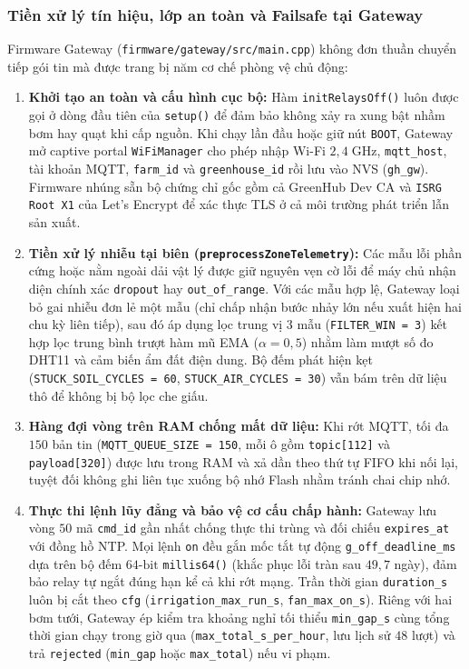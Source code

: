\subsubsection{Tiền xử lý tín hiệu, lớp an toàn và Failsafe tại Gateway}

Firmware Gateway (\texttt{firmware/gateway/src/main.cpp}) không đơn thuần chuyển tiếp gói tin mà được trang bị năm cơ chế phòng vệ chủ động:

\begin{enumerate}[leftmargin=*]
    \item \textbf{Khởi tạo an toàn và cấu hình cục bộ:} Hàm \texttt{initRelaysOff()} luôn được gọi ở dòng đầu tiên của \texttt{setup()} để đảm bảo không xảy ra xung bật nhầm bơm hay quạt khi cấp nguồn. Khi chạy lần đầu hoặc giữ nút \texttt{BOOT}, Gateway mở captive portal \texttt{WiFiManager} cho phép nhập Wi-Fi \(2{,}4\;\text{GHz}\), \texttt{mqtt\_host}, tài khoản MQTT, \texttt{farm\_id} và \texttt{greenhouse\_id} rồi lưu vào NVS (\texttt{gh\_gw}). Firmware nhúng sẵn bộ chứng chỉ gốc gồm cả GreenHub Dev CA và \texttt{ISRG Root X1} của Let's Encrypt để xác thực TLS ở cả môi trường phát triển lẫn sản xuất.
    \item \textbf{Tiền xử lý nhiễu tại biên (\texttt{preprocessZoneTelemetry}):} Các mẫu lỗi phần cứng hoặc nằm ngoài dải vật lý được giữ nguyên vẹn cờ lỗi để máy chủ nhận diện chính xác \texttt{dropout} hay \texttt{out\_of\_range}. Với các mẫu hợp lệ, Gateway loại bỏ gai nhiễu đơn lẻ một mẫu (chỉ chấp nhận bước nhảy lớn nếu xuất hiện hai chu kỳ liên tiếp), sau đó áp dụng lọc trung vị 3 mẫu (\texttt{FILTER\_WIN = 3}) kết hợp lọc trung bình trượt hàm mũ EMA (\(\alpha = 0{,}5\)) nhằm làm mượt số đo DHT11 và cảm biến ẩm đất điện dung. Bộ đếm phát hiện kẹt (\texttt{STUCK\_SOIL\_CYCLES = 60}, \texttt{STUCK\_AIR\_CYCLES = 30}) vẫn bám trên dữ liệu thô để không bị bộ lọc che giấu.
    \item \textbf{Hàng đợi vòng trên RAM chống mất dữ liệu:} Khi rớt MQTT, tối đa \(150\) bản tin (\texttt{MQTT\_QUEUE\_SIZE = 150}, mỗi ô gồm \texttt{topic[112]} và \texttt{payload[320]}) được lưu trong RAM và xả dần theo thứ tự FIFO khi nối lại, tuyệt đối không ghi liên tục xuống bộ nhớ Flash nhằm tránh chai chip nhớ.
    \item \textbf{Thực thi lệnh lũy đẳng và bảo vệ cơ cấu chấp hành:} Gateway lưu vòng \(50\) mã \texttt{cmd\_id} gần nhất chống thực thi trùng và đối chiếu \texttt{expires\_at} với đồng hồ NTP. Mọi lệnh \texttt{on} đều gắn mốc tắt tự động \texttt{g\_off\_deadline\_ms} dựa trên bộ đếm \(64\text{-bit}\) \texttt{millis64()} (khắc phục lỗi tràn sau \(49{,}7\) ngày), đảm bảo relay tự ngắt đúng hạn kể cả khi rớt mạng. Trần thời gian \texttt{duration\_s} luôn bị cắt theo \texttt{cfg} (\texttt{irrigation\_max\_run\_s}, \texttt{fan\_max\_on\_s}). Riêng với hai bơm tưới, Gateway ép kiểm tra khoảng nghỉ tối thiểu \texttt{min\_gap\_s} cùng tổng thời gian chạy trong giờ qua (\texttt{max\_total\_s\_per\_hour}, lưu lịch sử \(48\) lượt) và trả \texttt{rejected} (\texttt{min\_gap} hoặc \texttt{max\_total}) nếu vi phạm.

\end{enumerate}
